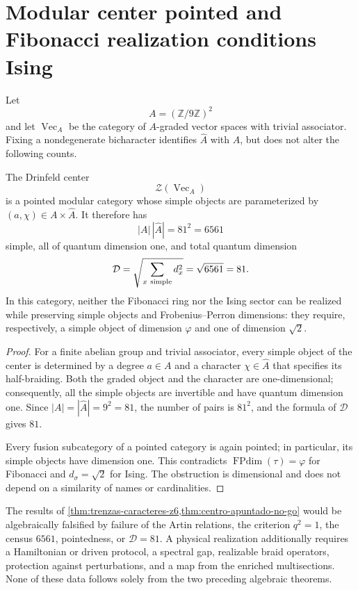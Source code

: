 \section[Modular center and topological realizations]{Modular center pointed and Fibonacci realization conditions Ising}
\label{sec:centro-apuntado-no-go}

Let
\[
 A=(\mathbb Z/9\mathbb Z)^2
\]
and let \(\operatorname{Vec}_A\) be the category of
\(A\)-graded vector spaces with trivial associator. Fixing a nondegenerate bicharacter
identifies \(\widehat A\) with \(A\), but does not alter the following counts.

\begin{theorem}
\label{thm:centro-apuntado-no-go}
The Drinfeld center
\[
 \mathcal Z(\operatorname{Vec}_A)
\]
is a pointed modular category whose simple objects are parameterized by
\((a,\chi)\in A\times\widehat A\). It therefore has
\[
 |A|\,|\widehat A|=81^2=6561
\]
simple, all of quantum dimension one, and total quantum dimension
\[
 \mathcal D
 =\sqrt{\sum_{x\ {\rm simple}}d_x^2}
 =\sqrt{6561}=81.
\]
In this category, neither the Fibonacci ring nor the Ising sector can be
realized while preserving simple objects and Frobenius--Perron dimensions: they require,
respectively, a simple object of dimension \(\varphi\) and one of dimension
\(\sqrt2\).
\end{theorem}

\begin{proof}
For a finite abelian group and trivial associator, every simple object of the
center is determined by a degree \(a\in A\) and a character
\(\chi\in\widehat A\) that specifies its half-braiding. Both the graded
object and the character are one-dimensional; consequently, all the
simple objects are invertible and have quantum dimension one. Since
\(|A|=|\widehat A|=9^2=81\), the number of pairs is \(81^2\), and the formula of
\(\mathcal D\) gives \(81\).

Every fusion subcategory of a pointed category is again pointed;
in particular, its simple objects have dimension one. This contradicts
\(\operatorname{FPdim}(\tau)=\varphi\) for Fibonacci and
\(d_\sigma=\sqrt2\) for Ising. The obstruction is dimensional and does not depend
on a similarity of names or cardinalities.
\end{proof}

\begin{criterion}
\label{crit:promocion-sectores-topologicos}
The results of
\cref{thm:trenzas-caracteres-z6,thm:centro-apuntado-no-go} would be
algebraically falsified by failure of the Artin relations, the
criterion \(q^2=1\), the census \(6561\), pointedness, or
\(\mathcal D=81\). A physical realization additionally requires a
Hamiltonian or driven protocol, a spectral gap, realizable braid
operators, protection against perturbations, and a map from the
enriched multisections. None of these data follows solely from
the two preceding algebraic theorems.
\end{criterion}
